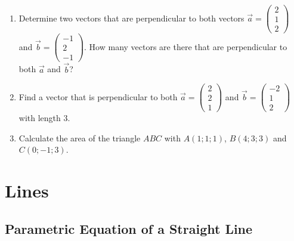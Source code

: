 \documentclass[12pt,eng]{skript_ogg}
\begin{document}
\begin{uebung}
\begin{enumerate}[\bfseries 1.]
	\item Determine two vectors that are perpendicular to both vectors $\vec{a}=\begin{pmatrix} 2\\1\\2 \end{pmatrix}$ and $\vec{b}=\begin{pmatrix} -1\\2\\-1 \end{pmatrix}$. How many vectors are there that are perpendicular to both $\vec{a}$ and $\vec{b}$?
	
	\vspace{5.5cm}
	
	\item Find a vector that is perpendicular to both $\vec{a}=\begin{pmatrix} 2\\2\\1 \end{pmatrix}$ and $\vec{b}=\begin{pmatrix} -2\\1\\2 \end{pmatrix}$ with length 3.
	
	\vspace{5.5cm}
	
	\item Calculate the area of the triangle $ABC$ with $A(1;1;1)$, $B(4;3;3)$ and $C(0;-1;3)$.
	
	\vspace{5.5cm}
\end{enumerate}
\end{uebung}

\section{Lines}

\vspace{-5mm}

\subsection{Parametric Equation of a Straight Line}

\vspace{-3mm}
\end{document}
